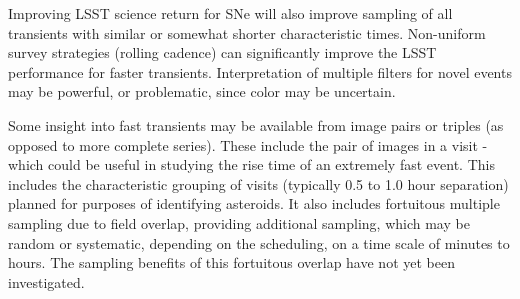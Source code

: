 Improving LSST science return for SNe will also improve sampling of
all transients with similar or somewhat shorter characteristic times.
Non-uniform survey strategies (rolling cadence) can significantly
improve the LSST performance for faster transients.  Interpretation of
multiple filters for novel events may be powerful, or problematic,
since color may be uncertain.

Some insight into fast transients may be available from image pairs or
triples (as opposed to more complete series).  These include the pair
of images in a visit - which could be useful in studying the rise time
of an extremely fast event.  This includes the characteristic grouping
of visits (typically 0.5 to 1.0 hour separation) planned for purposes
of identifying asteroids.  It also includes fortuitous multiple
sampling due to field overlap, providing additional sampling, which
may be random or systematic, depending on the scheduling, on a time
scale of minutes to hours.  The sampling benefits of this fortuitous
overlap have not yet been investigated.


\navigationbar












